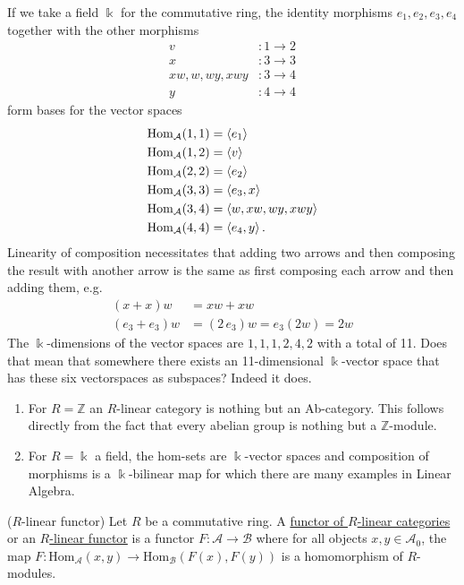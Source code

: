 \begin{example}
If we take a field $\Bbbk$ for the commutative ring, the identity morphisms $e_{1}, e_{2}, e_{3}, e_{4}$ together with the other morphisms
\begin{align*}
v &: 1 \rightarrow 2 \\
x &: 3 \rightarrow 3 \\
xw, w, wy, xwy &: 3 \rightarrow 4 \\
y &: 4 \rightarrow 4
\end{align*}
form bases for the vector spaces
\begin{align*}
\mathrm{Hom}_{\mathcal{A}}(1,1) &= \left< e_{1} \right> \\
\mathrm{Hom}_{\mathcal{A}}(1,2) &= \left< v \right> \\
\mathrm{Hom}_{\mathcal{A}}(2,2) &= \left< e_{2} \right> \\
\mathrm{Hom}_{\mathcal{A}}(3,3) &= \left< e_{3}, x \right> \\
\mathrm{Hom}_{\mathcal{A}}(3,4) &= \left< w, xw, wy, xwy \right> \\
\mathrm{Hom}_{\mathcal{A}}(4,4) &= \left< e_{4}, y \right>.
\end{align*}
Linearity of composition necessitates that adding two arrows and then composing the result with another arrow
is the same as first composing each arrow and then adding them, e.g.
\begin{align*}
(x+x)w &= xw + xw \\
(e_{3} + e_{3})w &= (2\,e_{3})w = e_{3}(2w) = 2w
\end{align*}
The $\Bbbk$-dimensions of the vector spaces are $1, 1, 1, 2, 4, 2$ with a total of 11. Does that mean that
somewhere there exists an 11-dimensional $\Bbbk$-vector space that has these six vectorspaces as subspaces? Indeed it does.
\end{example}

\begin{remark}
\begin{enumerate}
\renewcommand{\labelenumi}{(\theenumi)}
\item For $R = \mathbb{Z}$ an $R$-linear category is nothing but an Ab-category. This follows directly from the fact
that every abelian group is nothing but a $\mathbb{Z}$-module.
\item For $R = \Bbbk$ a field, the hom-sets are $\Bbbk$-vector spaces and composition of morphisms is a $\Bbbk$-bilinear
map for which there are many examples in Linear Algebra.
\end{enumerate}
\end{remark}

\begin{definition}{($R$-linear functor)}
Let $R$ be a commutative ring. A \ul{functor of $R$-linear categories} or an \ul{$R$-linear functor} is a functor
$F : \mathcal{A} \rightarrow \mathcal{B} $ where for all objects $x, y \in \mathcal{A}_{0}$, the map
$F : \mathrm{Hom}_{\mathcal{A}}(x,y) \rightarrow \mathrm{Hom}_{\mathcal{B}}(F(x), F(y))$ is a homomorphism
of $R$-modules.
\end{definition}

